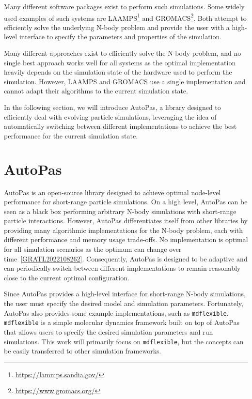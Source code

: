 Many different software packages exist to perform such simulations. Some widely used examples of such systems are LAAMPS\footnote{\url{https://lammps.sandia.gov/}} and GROMACS\footnote{\url{https://www.gromacs.org/}}. Both attempt to efficiently solve the underlying N-body problem and provide the user with a high-level interface to specify the parameters and properties of the simulation.

Many different approaches exist to efficiently solve the N-body problem, and no single best approach works well for all systems as the optimal implementation heavily depends on the simulation state of the hardware used to perform the simulation. However, LAAMPS and GROMACS use a single implementation and cannot adapt their algorithms to the current simulation state.

In the following section, we will introduce AutoPas, a library designed to efficiently deal with evolving particle simulations, leveraging the idea of automatically switching between different implementations to achieve the best performance for the current simulation state.

\section{AutoPas}

AutoPas is an open-source library designed to achieve optimal node-level performance for short-range particle simulations. On a high level, AutoPas can be seen as a black box performing arbitrary N-body simulations with short-range particle interactions. However, AutoPas differentiates itself from other libraries by providing many algorithmic implementations for the N-body problem, each with different performance and memory usage trade-offs. No implementation is optimal for all simulation scenarios as the optimum can change over time~\autoref{GRATL2022108262}. Consequently, AutoPas is designed to be adaptive and can periodically switch between different implementations to remain reasonably close to the current optimal configuration.

Since AutoPas provides a high-level interface for short-range N-body simulations, the user must specify the desired model and simulation parameters. Fortunately, AutoPas also provides some example implementations, such as \texttt{\gls{mdflexible}}. \texttt{\gls{mdflexible}} is a simple molecular dynamics framework built on top of AutoPas that allows users to specify the desired simulation parameters and run simulations. This work will primarily focus on \texttt{\gls{mdflexible}}, but the concepts can be easily transferred to other simulation frameworks.

